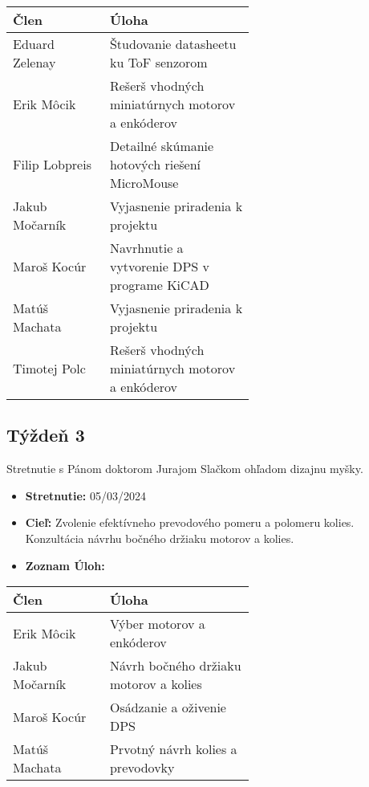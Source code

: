 \begin{table}[H]
    \centering
    \begin{tabular}{|l|p{0.6\linewidth}|}
        \hline
        \textbf{Člen} & \textbf{Úloha} \\
        \hline
        Eduard Zelenay & Študovanie datasheetu ku ToF senzorom \\
        \hline
        Erik Môcik & Rešerš vhodných miniatúrnych motorov a enkóderov \\
        \hline
        Filip Lobpreis & Detailné skúmanie hotových riešení MicroMouse  \\
        \hline
        Jakub Močarník & Vyjasnenie priradenia k projektu \\
        \hline
        Maroš Kocúr & Navrhnutie a vytvorenie DPS v programe KiCAD \\
        \hline
        Matúš Machata & Vyjasnenie priradenia k projektu \\
        \hline
        Timotej Polc & Rešerš vhodných miniatúrnych motorov a enkóderov \\
        \hline
    \end{tabular}
\end{table}
\newpage
\subsection{Týždeň 3}
Stretnutie s Pánom doktorom Jurajom Slačkom ohľadom dizajnu myšky.
\begin{itemize}
    \item \textbf{Stretnutie:} 05/03/2024
    \item \textbf{Cieľ: } Zvolenie efektívneho prevodového pomeru a polomeru kolies. Konzultácia návrhu bočného držiaku motorov a kolies.
    \item \textbf{Zoznam Úloh:}
\end{itemize}

\begin{table}[H]
    \centering
    \begin{tabular}{|l|p{0.6\linewidth}|}
        \hline
        \textbf{Člen} & \textbf{Úloha} \\
        \hline
        Erik Môcik & Výber motorov a enkóderov \\
        \hline
        Jakub Močarník & Návrh bočného držiaku motorov a kolies \\
        \hline
        Maroš Kocúr & Osádzanie a oživenie DPS \\
        \hline
        Matúš Machata & Prvotný návrh kolies a prevodovky \\
        \hline
    \end{tabular}
\end{table}

